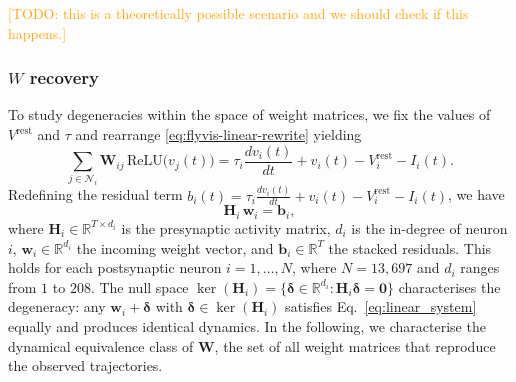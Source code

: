 \documentclass{article}
\newcommand{\comment}[1]{\textcolor{orange}{[#1]}}
\def\vrest{V^{\mathrm{rest}}}
\begin{document}
\comment{TODO: this is a theoretically possible scenario and we should check if this happens.}

\subsubsection*{$W$ recovery}


To study degeneracies within the space of weight matrices, we fix the values of $\vrest$ and $\tau$ and rearrange \cref{eq:flyvis-linear-rewrite} yielding
\begin{equation}
  \sum_{j\in\mathcal{N}_i} \mathbf{W}_{ij}\,\text{ReLU}\!\big(v_j(t)\big)
  = \tau_i \frac{dv_i(t)}{dt} + v_i(t) - V_i^{\text{rest}} - I_i(t).
\end{equation}
Redefining the residual term $b_i(t) = \tau_i \frac{dv_i(t)}{dt} + v_i(t) - V_i^{\text{rest}} - I_i(t)$, we have 
\begin{equation}
  \mathbf{H}_i\,\mathbf{w}_i = \mathbf{b}_i,
  \label{eq:linear_system}
\end{equation}
where $\mathbf{H}_i \in \mathbb{R}^{T \times d_i}$ is the presynaptic
activity matrix, $d_i$ is the in-degree of neuron $i$, $\mathbf{w}_i \in
\mathbb{R}^{d_i}$ the incoming weight vector, and $\mathbf{b}_i \in
\mathbb{R}^T$ the stacked residuals. This holds for each postsynaptic neuron
$i = 1, \ldots, N$, where $N = 13{,}697$ and $d_i$ ranges from $1$ to $208$.
The null space $\ker(\mathbf{H}_i) = \{\boldsymbol{\delta} \in \mathbb{R}^{d_i}
: \mathbf{H}_i\boldsymbol{\delta} = \mathbf{0}\}$ characterises the
degeneracy: any $\mathbf{w}_i + \boldsymbol{\delta}$ with $\boldsymbol{\delta}
\in \ker(\mathbf{H}_i)$ satisfies Eq.~\eqref{eq:linear_system} equally and
produces identical dynamics. In the following, we characterise the
dynamical equivalence class of $\mathbf{W}$, the set of all weight
matrices that reproduce the observed trajectories.
\end{document}
